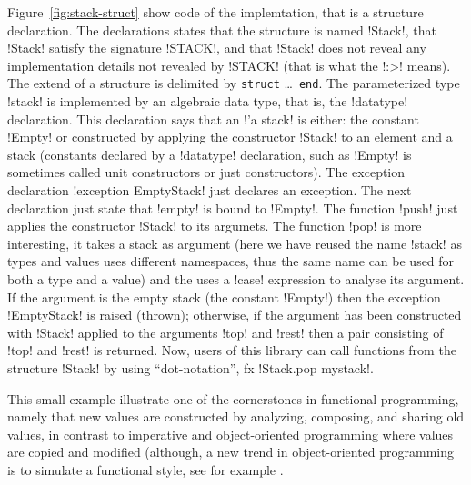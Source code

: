 \documentclass[workingdraft]{usetex-v1}
\begin{document}
Figure~\ref{fig:stack-struct} show code of the implemtation, that is a
structure declaration.  The declarations states
that the structure is named !Stack!, that !Stack! satisfy the
signature !STACK!, and that !Stack! does not reveal any implementation
details not revealed by !STACK! (that is what the !:>! means).  The
extend of a structure is delimited by \texttt{struct} \ldots\ 
\texttt{end}.  The parameterized type !stack! is implemented by an
algebraic data type, that is, the !datatype! declaration.  This
declaration says that an !'a stack! is either: the constant !Empty! or
constructed by applying the constructor !Stack! to an element and a
stack (constants declared by a !datatype! declaration, such as !Empty!
is sometimes called unit constructors or just constructors).  The
exception declaration !exception EmptyStack! just declares an
exception.  The next declaration just state that !empty! is bound to
!Empty!.  The function !push! just applies the constructor !Stack! to
its argumets.  The function !pop! is more interesting, it takes a
stack as argument (here we have reused the name !stack! as types and
values uses different namespaces, thus the same name can be used for
both a type and a value) and the uses a !case! expression to analyse
its argument.  If the argument is the empty stack (the constant
!Empty!) then the exception !EmptyStack! is raised (thrown);
otherwise, if the argument has been constructed with !Stack! applied
to the arguments !top! and !rest! then a pair consisting of !top! and
!rest! is returned.  Now, users of this library can call functions
from the structure !Stack! by using ``dot-notation'', fx !Stack.pop mystack!.



This small example illustrate one of the cornerstones in functional
programming, namely that new values are constructed by analyzing,
composing, and sharing old values, in contrast to imperative and
object-oriented programming where values are copied and modified
(although, a new trend in object-oriented programming is to simulate a
functional style, see for example \cite[Item 13 and
14]{bloch01:effective-java}.





\end{document}
